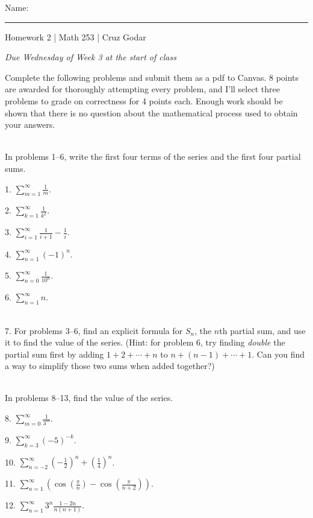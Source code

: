 \documentclass{article}
\begin{document}
\Large Name: \rule{2in}{0.15mm} \hfill Homework 2 | Math 253 | Cruz Godar \vspace{4pt}  \normalsize

\textit{Due Wednesday of Week 3 at the start of class}

Complete the following problems and submit them as a pdf to Canvas. 8 points are awarded for thoroughly attempting every problem, and I'll select three problems to grade on correctness for 4 points each. Enough work should be shown that there is no question about the mathematical process used to obtain your answers.

~\\

In problems 1--6, write the first four terms of the series and the first four partial sums.

1. $\displaystyle \sum_{m = 1}^\infty \frac{1}{m}$.

2. $\displaystyle \sum_{k = 1}^\infty \frac{1}{k^2}$.

3. $\displaystyle \sum_{i = 1}^\infty \frac{1}{i + 1} - \frac{1}{i}$.

4. $\displaystyle \sum_{n = 1}^\infty (-1)^n$.

5. $\displaystyle \sum_{n = 0}^\infty \frac{1}{10^n}$.

6. $\displaystyle \sum_{n = 1}^\infty n$.

~\\

7. For problems 3--6, find an explicit formula for $S_n$, the $n$th partial sum, and use it to find the value of the series. (Hint: for problem 6, try finding \textit{double} the partial sum first by adding $1 + 2 + \cdots + n$ to $n + (n - 1) + \cdots + 1$. Can you find a way to simplify those two sums when added together?)

~\\

In problems 8--13, find the value of the series.

8. $\displaystyle \sum_{m = 0}^\infty \frac{1}{3^m}$.

9. $\displaystyle \sum_{k = 3}^\infty (-5)^{-k}$.

10. $\displaystyle \sum_{n = -2}^\infty \left( -\frac{1}{2} \right)^n + \left( \frac{1}{4} \right)^n$.

11. $\displaystyle \sum_{n = 1}^\infty \left( \cos\left( \frac{\pi}{n} \right) - \cos\left( \frac{\pi}{n + 2} \right) \right)$.

12. $\displaystyle \sum_{n = 1}^\infty 3^n\frac{1 - 2n}{n(n + 1)}$.
\end{document}
